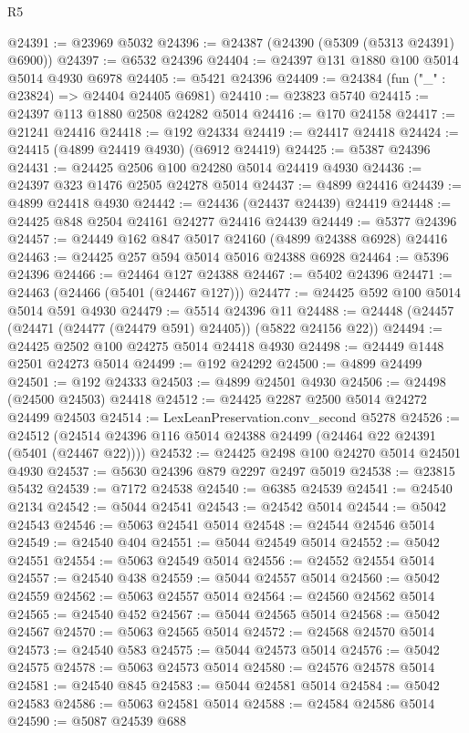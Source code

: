 \begin{lexlean}{R5}
\begin{coremodule}
@24391 := @23969 @5032
@24396 := @24387 (@24390 (@5309 (@5313 @24391) @6900))
@24397 := @6532 @24396
@24404 := @24397 @131 @1880 @100 @5014 @5014 @4930 @6978
@24405 := @5421 @24396
@24409 := @24384 (fun ("_" : @23824) => @24404 @24405 @6981)
@24410 := @23823 @5740
@24415 := @24397 @113 @1880 @2508 @24282 @5014
@24416 := @170 @24158
@24417 := @21241 @24416
@24418 := @192 @24334
@24419 := @24417 @24418
@24424 := @24415 (@4899 @24419 @4930) (@6912 @24419)
@24425 := @5387 @24396
@24431 := @24425 @2506 @100 @24280 @5014 @24419 @4930
@24436 := @24397 @323 @1476 @2505 @24278 @5014
@24437 := @4899 @24416
@24439 := @4899 @24418 @4930
@24442 := @24436 (@24437 @24439) @24419
@24448 := @24425 @848 @2504 @24161 @24277 @24416 @24439
@24449 := @5377 @24396
@24457 := @24449 @162 @847 @5017 @24160 (@4899 @24388 @6928) @24416
@24463 := @24425 @257 @594 @5014 @5016 @24388 @6928
@24464 := @5396 @24396
@24466 := @24464 @127 @24388
@24467 := @5402 @24396
@24471 := @24463 (@24466 (@5401 (@24467 @127)))
@24477 := @24425 @592 @100 @5014 @5014 @591 @4930
@24479 := @5514 @24396 @11
@24488 := @24448 (@24457 (@24471 (@24477 (@24479 @591) @24405)) (@5822 @24156 @22))
@24494 := @24425 @2502 @100 @24275 @5014 @24418 @4930
@24498 := @24449 @1448 @2501 @24273 @5014
@24499 := @192 @24292
@24500 := @4899 @24499
@24501 := @192 @24333
@24503 := @4899 @24501 @4930
@24506 := @24498 (@24500 @24503) @24418
@24512 := @24425 @2287 @2500 @5014 @24272 @24499 @24503
@24514 := LexLeanPreservation.conv_second @5278
@24526 := @24512 (@24514 @24396 @116 @5014 @24388 @24499 (@24464 @22 @24391 (@5401 (@24467 @22))))
@24532 := @24425 @2498 @100 @24270 @5014 @24501 @4930
@24537 := @5630 @24396 @879 @2297 @2497 @5019
@24538 := @23815 @5432
@24539 := @7172 @24538
@24540 := @6385 @24539
@24541 := @24540 @2134
@24542 := @5044 @24541
@24543 := @24542 @5014
@24544 := @5042 @24543
@24546 := @5063 @24541 @5014
@24548 := @24544 @24546 @5014
@24549 := @24540 @404
@24551 := @5044 @24549 @5014
@24552 := @5042 @24551
@24554 := @5063 @24549 @5014
@24556 := @24552 @24554 @5014
@24557 := @24540 @438
@24559 := @5044 @24557 @5014
@24560 := @5042 @24559
@24562 := @5063 @24557 @5014
@24564 := @24560 @24562 @5014
@24565 := @24540 @452
@24567 := @5044 @24565 @5014
@24568 := @5042 @24567
@24570 := @5063 @24565 @5014
@24572 := @24568 @24570 @5014
@24573 := @24540 @583
@24575 := @5044 @24573 @5014
@24576 := @5042 @24575
@24578 := @5063 @24573 @5014
@24580 := @24576 @24578 @5014
@24581 := @24540 @845
@24583 := @5044 @24581 @5014
@24584 := @5042 @24583
@24586 := @5063 @24581 @5014
@24588 := @24584 @24586 @5014
@24590 := @5087 @24539 @688

\end{coremodule}
\end{lexlean}
